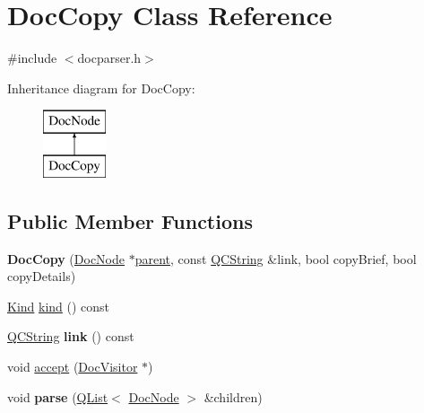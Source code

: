 \hypertarget{class_doc_copy}{}\section{Doc\+Copy Class Reference}
\label{class_doc_copy}


{\ttfamily \#include $<$docparser.\+h$>$}

Inheritance diagram for Doc\+Copy\+:\begin{figure}[H]
\begin{center}
\leavevmode
\includegraphics[height=2.000000cm]{class_doc_copy}
\end{center}
\end{figure}
\subsection*{Public Member Functions}
\begin{DoxyCompactItemize}
\item 
\mbox{\label{class_doc_copy_acd88cf1e2b750a84de520db1539136fb}} 
{\bfseries Doc\+Copy} (\mbox{\hyperlink{class_doc_node}{Doc\+Node}} $\ast$\mbox{\hyperlink{class_doc_node_a73e8ad29a91cfceb0968eb00db71a23d}{parent}}, const \mbox{\hyperlink{class_q_c_string}{Q\+C\+String}} \&link, bool copy\+Brief, bool copy\+Details)
\item 
\mbox{\hyperlink{class_doc_node_aebd16e89ca590d84cbd40543ea5faadb}{Kind}} \mbox{\hyperlink{class_doc_copy_ac389e4de240c92f7c2a9f4183f033cdf}{kind}} () const
\item 
\mbox{\label{class_doc_copy_a203f707ede6ae00140baa55136d15b1c}} 
\mbox{\hyperlink{class_q_c_string}{Q\+C\+String}} {\bfseries link} () const
\item 
void \mbox{\hyperlink{class_doc_copy_a9b719f84800b76fcb9d441b9b64245d0}{accept}} (\mbox{\hyperlink{class_doc_visitor}{Doc\+Visitor}} $\ast$)
\item 
\mbox{\label{class_doc_copy_a75619f5170d53a67f7028123e4ab18b8}} 
void {\bfseries parse} (\mbox{\hyperlink{class_q_list}{Q\+List}}$<$ \mbox{\hyperlink{class_doc_node}{Doc\+Node}} $>$ \&children)
\end{DoxyCompactItemize}
